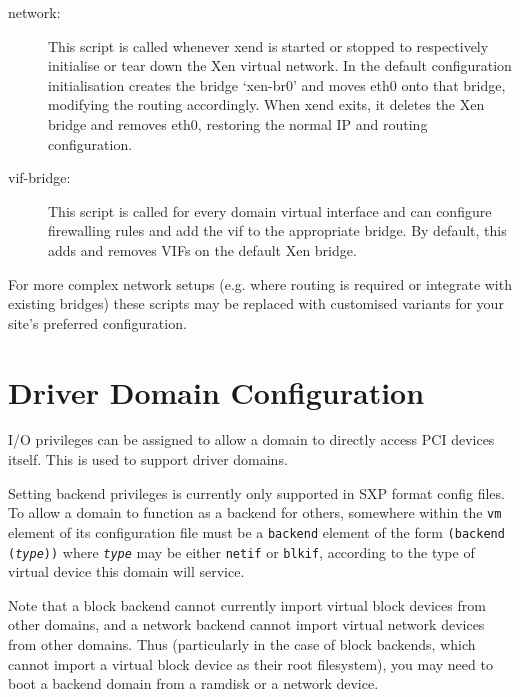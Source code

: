 \documentclass[11pt,twoside,final,openright]{report}
\def\xend{{xend}\xspace}
\begin{document}
{\begin{description} 

\item[network:] This script is called whenever \xend is started or
stopped to respectively initialise or tear down the Xen virtual
network. In the default configuration initialisation creates the
bridge `xen-br0' and moves eth0 onto that bridge, modifying the
routing accordingly. When \xend exits, it deletes the Xen bridge and
removes eth0, restoring the normal IP and routing configuration.


\item[vif-bridge:] This script is called for every domain virtual
interface and can configure firewalling rules and add the vif 
to the appropriate bridge. By default, this adds and removes 
VIFs on the default Xen bridge.

\end{description} 

For more complex network setups (e.g. where routing is required or
integrate with existing bridges) these scripts may be replaced with
customised variants for your site's preferred configuration.


\section{Driver Domain Configuration} 

I/O privileges can be assigned to allow a domain to directly access
PCI devices itself.  This is used to support driver domains.

Setting backend privileges is currently only supported in SXP format
config files.  To allow a domain to function as a backend for others,
somewhere within the {\tt vm} element of its configuration file must
be a {\tt backend} element of the form {\tt (backend ({\em type}))}
where {\tt \em type} may be either {\tt netif} or {\tt blkif},
according to the type of virtual device this domain will service.

Note that a block backend cannot currently import virtual block
devices from other domains, and a network backend cannot import
virtual network devices from other domains.  Thus (particularly in the
case of block backends, which cannot import a virtual block device as
their root filesystem), you may need to boot a backend domain from a
ramdisk or a network device.

}
\end{document}
